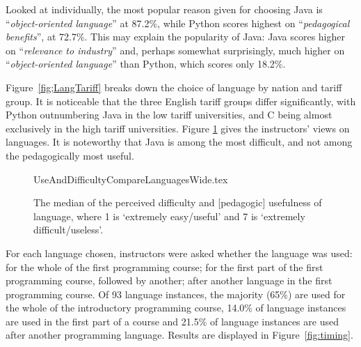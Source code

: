 \documentclass[a4paper,11pt]{article}
\begin{document}
Looked at individually, the most popular reason given for choosing
Java is ``{\emph{object-oriented language}}'' at 87.2\%, while Python
scores highest on ``{\emph{pedagogical benefits}}'', at 72.7\%. This
may explain the popularity of Java: Java scores higher on
``{\emph{relevance to industry}}'' and, perhaps somewhat surprisingly,
much higher on ``{\emph{object-oriented language}}'' than Python,
which scores only 18.2\%.


Figure~\ref{fig;LangTariff} breaks down the choice of language by
nation and tariff group.  It is noticeable that the three English
tariff groups differ significantly, with Python outnumbering Java in
the low tariff universities, and C being almost exclusively in the
high tariff universities. Figure \ref{fig:utility} gives the
instructors' views on languages. It is noteworthy that Java is among
the most difficult, and not among the pedagogically most useful.

\begin{figure}
\begin{center}
{UseAndDifficultyCompareLanguagesWide.tex}
\end{center}
\caption{The median of the perceived difficulty and [pedagogic] usefulness of language, where 1 is `extremely easy/useful' and 7 is `extremely difficult/useless'.%
\label{fig:utility}}
\end{figure}

For each language chosen, instructors were asked whether the language
was used: for the whole of the first programming course; for the first
part of the first programming course, followed by another; after
another language in the first programming course. Of 93 language
instances, the majority (65\%) are used for the whole of the
introductory programming course, 14.0\% of language instances are used
in the first part of a course and 21.5\% of language instances are
used after another programming language. Results are displayed in
Figure~\ref{fig:timing}.
\end{document}
